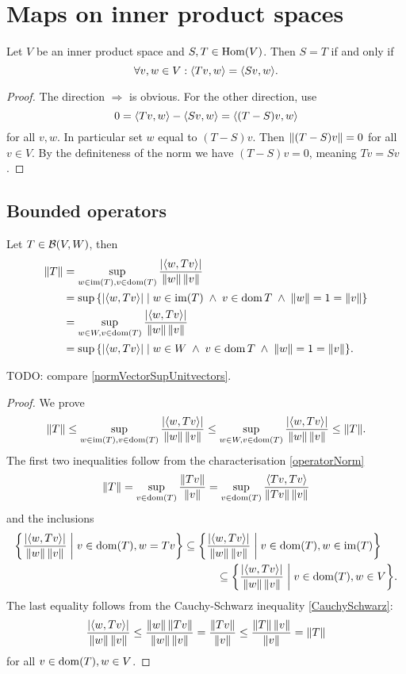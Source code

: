 \section{Maps on inner product spaces}

\begin{lemma} \label{equalityOfMapsInnerProductSpaces}
Let $V$ be an inner product space and $S,T\in\operatorname{Hom}(V)$. Then $S=T$ \textup{if and only if}
\[ \forall v,w\in V: \inner{Tv,w} = \inner{Sv,w}. \]
\end{lemma}
\begin{proof}
The direction $\boxed{\Rightarrow}$ is obvious. For the other direction, use
\[ 0 = \inner{Tv,w} - \inner{Sv,w} = \inner{(T-S)v,w} \]
for all $v,w$. In particular set $w$ equal to $(T-S)v$. Then $\lVert(T-S)v\rVert = 0$ for all $v\in V$. By the definiteness of the norm we have $(T-S)v = 0$, meaning $Tv = Sv$.
\end{proof}

\subsection{Bounded operators}
\begin{lemma} \label{operatorNormInnerProduct}
Let $T\in\operatorname{\mathcal{B}}(V,W)$, then
\begin{align*}
\norm{T} &= \sup_{w\in \im(T),v \in \dom(T)} \frac{|\inner{w,Tv}|}{\norm{w}\,\norm{v}} \\
&= \sup\setbuilder{|\inner{w,Tv}|}{w\in \im(T)\;\land\; v\in\dom{T}\;\land\; \norm{w} = 1 = \norm{v}} \\
&= \sup_{w\in W,v \in \dom(T)} \frac{|\inner{w,Tv}|}{\norm{w}\,\norm{v}} \\
&= \sup\setbuilder{|\inner{w,Tv}|}{w\in W\;\land\; v\in\dom{T}\;\land\; \norm{w} = 1 = \norm{v}}.
\end{align*}
\end{lemma}
TODO: compare \ref{normVectorSupUnitvectors}.
\begin{proof}
We prove
\[ \norm{T} \leq \sup_{w\in \im(T),v \in \dom(T)} \frac{|\inner{w,Tv}|}{\norm{w}\,\norm{v}} \leq \sup_{w\in W,v \in \dom(T)} \frac{|\inner{w,Tv}|}{\norm{w}\,\norm{v}} \leq \norm{T}. \]
The first two inequalities follow from the characterisation \ref{operatorNorm}
\[ \norm{T} = \sup_{v \in \dom(T)} \frac{\norm{Tv}}{\norm{v}} = \sup_{v \in \dom(T)} \frac{\inner{Tv,Tv}}{\norm{Tv}\,\norm{v}} \]
and the inclusions
\begin{align*}
\setbuilder{\frac{|\inner{w,Tv}|}{\norm{w}\,\norm{v}}}{v\in\dom(T), w = Tv} &\subseteq \setbuilder{\frac{|\inner{w,Tv}|}{\norm{w}\,\norm{v}}}{v\in\dom(T), w\in\im(T)}\\
&\qquad\quad\subseteq \setbuilder{\frac{|\inner{w,Tv}|}{\norm{w}\,\norm{v}}}{v\in\dom(T), w\in V}.
\end{align*}
The last equality follows from the Cauchy-Schwarz inequality \ref{CauchySchwarz}:
\[ \frac{|\inner{w,Tv}|}{\norm{w}\,\norm{v}} \leq \frac{\norm{w}\,\norm{Tv}}{\norm{w}\,\norm{v}} = \frac{\norm{Tv}}{\norm{v}} \leq \frac{\norm{T}\,\norm{v}}{\norm{v}} = \norm{T} \]
for all $v\in\operatorname{dom}(T), w\in V$. 
\end{proof}

